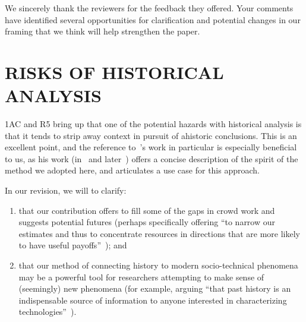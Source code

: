 \documentclass[11pt]{article}
\begin{document}
We sincerely thank the reviewers for the feedback they offered. Your comments have identified several opportunities for clarification and potential changes in our framing that we think will help strengthen the paper.

\section{RISKS OF HISTORICAL ANALYSIS}
1AC and R5 bring up that one of the potential hazards with
historical analysis is that
it tends to strip away context in pursuit of ahistoric conclusions.
This is an excellent point, and
the reference to~\citeauthor{rosenberg1994exploring}'s
work in particular is especially beneficial to us, as his work
(in~\citeyear{rosenberg1982inside} and later~\citeyear{rosenberg1994exploring})
offers a concise description of the spirit of the method we adopted here,
and articulates a use case for this approach.

In our revision, we will to clarify:
\begin{enumerate}
  \item that our contribution offers to fill some of the gaps in crowd work and suggests potential futures
        (perhaps specifically offering
            ``to narrow our estimates
              and thus to concentrate resources
              in directions that are more likely to have useful payoffs''~\cite{rosenberg1994exploring});
  and
  \item that our method of connecting history to modern socio-technical phenomena may be
        a powerful tool for researchers attempting
        to make sense of (seemingly) new phenomena
        (for example,
        arguing ``that past history is
                  an indispensable source of information
                  to anyone interested in characterizing technologies''~\cite{rosenberg1982inside}).
\end{enumerate}


\end{document}
